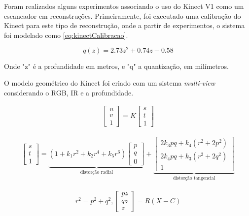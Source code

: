 Foram realizados alguns experimentos associando o uso do Kinect V1 como um escaneador em reconstruções. Primeiramente, foi executado uma calibração do Kinect para este tipo de reconstrução, onde a partir de experimentos, o sistema foi modelado como \ref{eq:kinectCalibracao}.

\begin{equation}
\label{eq:kinectCalibracao}
q(z)=2.73z^{2}+0.74z-0.58
\end{equation}

Onde "z" é a profundidade em metros, e "q" a quantização, em milímetros.

O modelo geométrico do Kinect foi criado com um sistema \emph{multi-view} considerando o RGB, IR e a profundidade.

\begin{gather} 
\label{eq:matrix}
\begin{bmatrix}
u\\
v\\
1
\end{bmatrix} 
= K
\begin{bmatrix}
s\\
t\\
1
\end{bmatrix}
\end{gather}

\begin{gather} 
\begin{bmatrix}
s\\
t\\
1
\end{bmatrix} 
= 
\underbrace{(1 + k_1r^2 + k_2r^4 + k_5r^6) 
\begin{bmatrix}
p\\
q\\
0
\end{bmatrix} }_{\text{distorção radial}} 
+
\underbrace{
\begin{bmatrix}
2k_3pq+k_4(r^2+2p^2)\\
2k_4pq+k_3(r^2+2q^2)\\
1
\end{bmatrix} }_{\text{distorção tangencial}}
\label{eq:distorcaoKinect}
\end{gather}

\begin{gather}
r^2 = p^2+q^2, 
\begin{bmatrix}
pz\\ 
qz\\ 
z
\end{bmatrix} = R(X-C)
\label{eq:relacaoKinect}
\end{gather}



